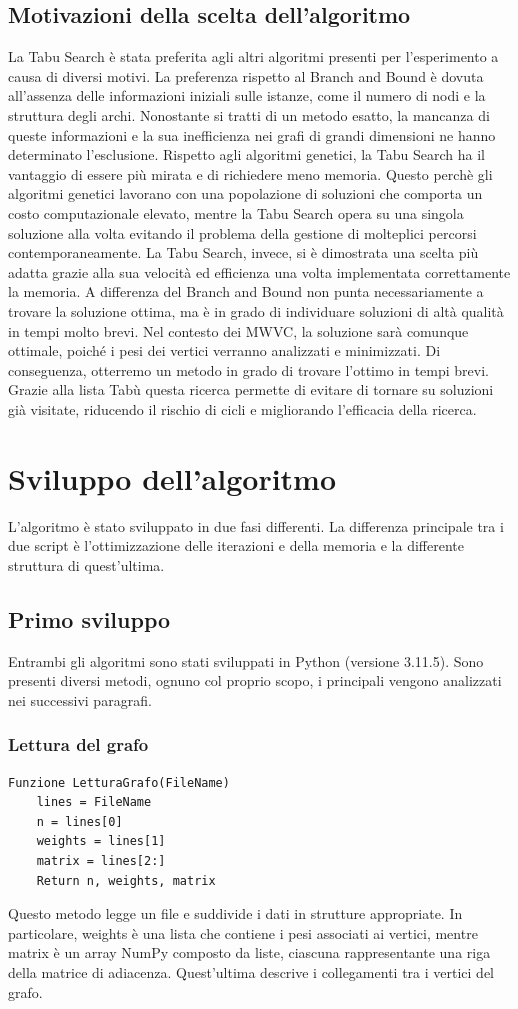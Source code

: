 \documentclass[12pt,a4paper,twoside]{article}
\begin{document}
\subsection{Motivazioni della scelta dell'algoritmo}
La Tabu Search è stata preferita agli altri algoritmi presenti per l'esperimento a causa di diversi motivi. La preferenza rispetto al Branch and Bound è dovuta all'assenza delle informazioni iniziali sulle istanze, come il numero di nodi e la struttura degli archi. Nonostante si tratti di un metodo esatto, la mancanza di queste informazioni e la sua inefficienza nei grafi di grandi dimensioni ne hanno determinato l’esclusione. Rispetto agli algoritmi genetici, la Tabu Search ha il vantaggio di essere più mirata e di richiedere meno memoria. Questo perchè gli algoritmi genetici lavorano con una popolazione di soluzioni che comporta un costo computazionale elevato, mentre la Tabu Search opera su una singola soluzione alla volta evitando il problema della gestione di molteplici percorsi contemporaneamente. La Tabu Search, invece, si è dimostrata una scelta più adatta grazie alla sua velocità ed efficienza una volta implementata correttamente la memoria. A differenza del Branch and Bound non punta necessariamente a trovare la soluzione ottima, ma è in grado di individuare soluzioni di altà qualità in tempi molto brevi. Nel contesto dei MWVC, la soluzione sarà comunque ottimale, poiché i pesi dei vertici verranno analizzati e minimizzati. Di conseguenza, otterremo un metodo in grado di trovare l'ottimo in tempi brevi. Grazie alla lista Tabù questa ricerca permette di evitare di tornare su soluzioni già visitate, riducendo il rischio di cicli e migliorando l'efficacia della ricerca.
\clearpage
\section{Sviluppo dell'algoritmo}
L'algoritmo è stato sviluppato in due fasi differenti. La differenza principale tra i due script è l'ottimizzazione delle iterazioni e della memoria e la differente struttura di quest'ultima.
\subsection{Primo sviluppo}
Entrambi gli algoritmi sono stati sviluppati in Python (versione 3.11.5). Sono presenti diversi metodi, ognuno col proprio scopo, i principali vengono analizzati nei successivi paragrafi.
\subsubsection{Lettura del grafo}
\begin{verbatim}
Funzione LetturaGrafo(FileName)
    lines = FileName
    n = lines[0]
    weights = lines[1]
    matrix = lines[2:]
    Return n, weights, matrix
\end{verbatim}
Questo metodo legge un file e suddivide i dati in strutture appropriate. In particolare, weights è una lista che contiene i pesi associati ai vertici, mentre matrix è un array NumPy composto da liste, ciascuna rappresentante una riga della matrice di adiacenza. Quest'ultima descrive i collegamenti tra i vertici del grafo.
\end{document}
